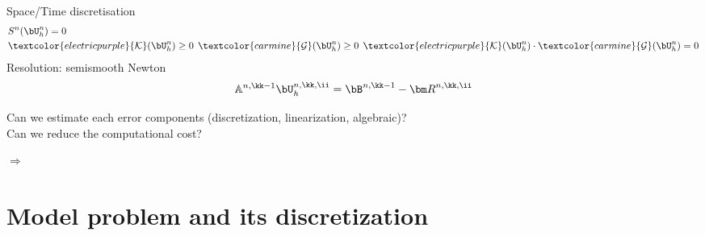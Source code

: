 \documentclass[10 pt]{beamer}
\begin{document}
\begin{frame}
\begin{minipage}{0.53 \linewidth}
\begin{equation*}
\end{equation*}
Space/Time discretisation
\begin{equation*}
\begin{split}
&S^n(\bU_h^n)=0\\
& \textcolor{electricpurple}{\mathcal{K}}(\bU_h^n) \geq 0 \hspace{0.15 cm} \textcolor{carmine}{\mathcal{G}}(\bU_h^n) \geq 0 \hspace{0.15 cm} \textcolor{electricpurple}{\mathcal{K}}(\bU_h^n) \cdot \textcolor{carmine}{\mathcal{G}}(\bU_h^n)=0
\end{split}
\end{equation*}
Resolution: semismooth Newton 
\begin{equation*}
\mathbb{A}^{n,\kk-1} \bU_h^{n,\kk,\ii} = \bB^{n,\kk-1}-{\bm R}^{n,\kk,\ii}
\end{equation*}
\end{minipage}
\pause
\begin{minipage}{0.49 \linewidth}
Can we estimate each error components (discretization, linearization, algebraic)?\\
 Can we reduce the computational cost?
\end{minipage}
\hfill
\begin{minipage}{0.49 \linewidth}
${\bm \Rightarrow}$ 
\end{minipage}
\end{frame}

\section{Model problem and its discretization}
    
\subsection{}  
\end{document}
